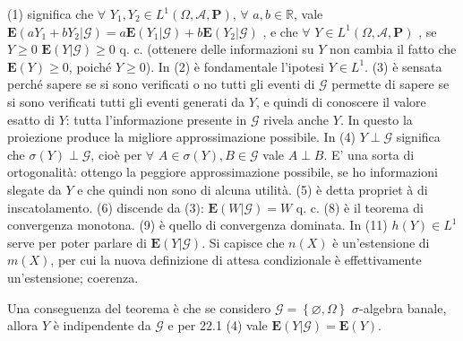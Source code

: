 \documentclass{article}
\begin{document}
(1) significa che $\forall $ $Y_{1},Y_{2}\in L^{1}\left( \Omega ,\mathcal{A},%
\mathbf{P}\right) $, $\forall $ $a,b\in 
\mathbb{R}
$, vale $\mathbf{E}\left( aY_{1}+bY_{2}|\mathcal{G}\right) =a\mathbf{E}%
\left( Y_{1}|\mathcal{G}\right) +b\mathbf{E}\left( Y_{2}|\mathcal{G}\right) $%
, e che $\forall $ $Y\in L^{1}\left( \Omega ,\mathcal{A},\mathbf{P}\right) $%
, se $Y\geq 0$ $\mathbf{E}\left( Y|\mathcal{G}\right) \geq 0$ q. c.
(ottenere delle informazioni su $Y$ non cambia il fatto che $\mathbf{E}%
\left( Y\right) \geq 0$, poich\'{e} $Y\geq 0$). In (2) \`{e} fondamentale
l'ipotesi $Y\in L^{1}$. (3) \`{e} sensata perch\'{e} sapere se si sono
verificati o no tutti gli eventi di $\mathcal{G}$ permette di sapere se si
sono verificati tutti gli eventi generati da $Y$, e quindi di conoscere il
valore esatto di $Y$: tutta l'informazione presente in $\mathcal{G}$ rivela
anche $Y$. In questo la proiezione produce la migliore approssimazione
possibile. In (4) $Y\perp \mathcal{G}$ significa che $\sigma \left( Y\right)
\perp \mathcal{G}$, cio\`{e} per $\forall $ $A\in \sigma \left( Y\right)
,B\in \mathcal{G}$ vale $A\perp B$. E' una sorta di ortogonalit\`{a}:
ottengo la peggiore approssimazione possibile, se ho informazioni slegate da 
$Y$ e che quindi non sono di alcuna utilit\`{a}. (5) \`{e} detta propriet%
\`{a} di inscatolamento. (6) discende da (3): $\mathbf{E}\left( W|\mathcal{G}%
\right) =W$ q. c. (8) \`{e} il teorema di convergenza monotona. (9) \`{e}
quello di convergenza dominata. In (11) $h\left( Y\right) \in L^{1}$ serve
per poter parlare di $\mathbf{E}\left( Y|\mathcal{G}\right) $. Si capisce
che $n\left( X\right) $ \`{e} un'estensione di $m\left( X\right) $, per cui
la nuova definizione di attesa condizionale \`{e} effettivamente
un'estensione; coerenza.

Una conseguenza del teorema \`{e} che se considero $\mathcal{G=}\left\{
\varnothing ,\Omega \right\} $ $\sigma $-algebra banale, allora $Y$ \`{e}
indipendente da $\mathcal{G}$ e per 22.1 (4) vale $\mathbf{E}\left( Y|%
\mathcal{G}\right) =\mathbf{E}\left( Y\right) $.
\end{document}
